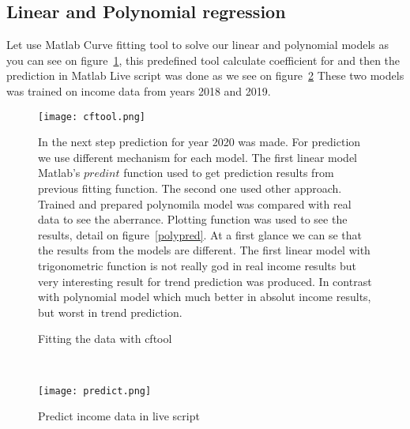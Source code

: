 \subsection{Linear and Polynomial regression} \label{sec:baseline}
Let use Matlab Curve fitting tool to solve our linear and polynomial models as you can see on figure~\ref{cftool}, this predefined tool calculate coefficient for and then
the prediction in Matlab Live script was done as we see on figure~\ref{predict}
These two models was trained on income data from years 2018 and 2019.
\begin{figure}[h!]
    \begin{center}
        \texttt{[image: cftool.png]}
    \end{center}
    \caption{Fitting the data with cftool~\cite{luarn}}
    \label{cftool}
In the next step prediction for year 2020 was made. For prediction we use different mechanism for each model.
The first linear model Matlab's $predint$ function used to get prediction results from previous fitting function.
The second one used other approach.
Trained and prepared polynomila model was compared with real data to see the aberrance.
Plotting function was used to see the results, detail on figure~\ref{polypred}.
At a first glance we can se that the results from the models are different.
The first linear model with trigonometric function
is not really god in real income results but very interesting result for trend prediction was produced.
In contrast with polynomial model which much better in absolut income results, but worst in trend prediction.
\end{figure}\\
\begin{figure}[h!]
    \begin{center}
        \texttt{[image: predict.png]}
    \end{center}
    \caption{Predict income data in live script~\cite{luarn}}
    \label{predict}
\end{figure}\\
